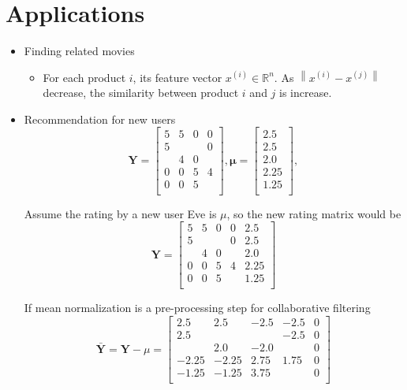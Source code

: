 \section{Applications}
\begin{itemize}
    \item Finding related movies
    \begin{itemize}
        \item For each product $i$, its feature vector $x^{(i)} \in \mathbb{R}^n$.
        As $\left\|x^{(i)} - x^{(j)}\right\|$ decrease, the similarity between product $i$ and $j$ is increase.
    \end{itemize}

    \item Recommendation for new users
    \begin{equation}
        \mathbf{Y}   = \left[\begin{array}{cccc} 5 & 5 & 0 & 0 \\ 5 &   &   & 0 \\   & 4 & 0 &   \\ 0 & 0 & 5 & 4 \\ 0 & 0 & 5 &  \\ \end{array}\right], 
        \mathbf{\mu} = \left[\begin{array}{c} 2.5 \\ 2.5 \\ 2.0 \\ 2.25 \\ 1.25 \\ \end{array}\right], 
    \end{equation}
    
    Assume the rating by a new user Eve is $\mu$, so the new rating matrix would be
    \begin{equation}
        \mathbf{Y}   = \left[\begin{array}{ccccc} 5 & 5 & 0 & 0 & 2.5 \\ 5 &   &   & 0 & 2.5 \\   & 4 & 0 &  & 2.0 \\ 0 & 0 & 5 & 4 & 2.25\\ 0 & 0 & 5 & & 1.25 \\ \end{array}\right]
    \end{equation}
    
    If mean normalization is a pre-processing step for collaborative filtering
    \begin{equation}
        \bar{\mathbf{Y}} = \mathbf{Y} - \mu = \left[\begin{array}{ccccc} 2.5 & 2.5 & -2.5 & -2.5 & 0\\ 2.5 &   &   & -2.5 & 0\\   & 2.0 & -2.0 &  & 0 \\ -2.25 & -2.25 & 2.75 & 1.75  & 0\\ -1.25 & -1.25 & 3.75 &  & 0 \\ \end{array}\right]
    \end{equation}


\end{itemize}
